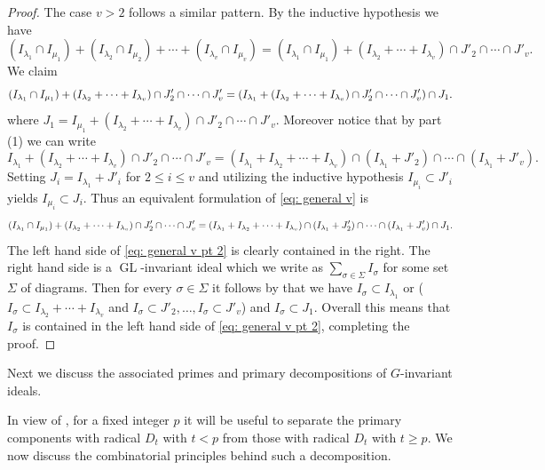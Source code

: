 \documentclass[11pt, reqno]{amsart}
\numberwithin{equation}{section}
\theoremstyle{definition}
\DeclareMathOperator{\GL}{GL}
\renewcommand{\l}{\lambda}
\newcommand{\s}{\sigma}
\begin{document}
\begin{proof}
		The case $v>2$ follows a similar pattern. By the inductive hypothesis we have
		\[
		(I_{\l_1}\cap I_{\mu_1})+ (I_{\l_2}\cap I_{\mu_2})+ \cdots +(I_{\l_v}\cap I_{\mu_v}) =(I_{\l_1}\cap I_{\mu_1})+(I_{\l_2}+\cdots+I_{\l_v})\cap J'_2\cap \cdots \cap J'_{v}.
		\]
		We claim
		\begin{equation}\label{eq: general v}
			(I_{\l_1}\cap I_{\mu_1})+(I_{\l_2}+\cdots+I_{\l_v})\cap J'_2\cap \cdots \cap J'_{v}\\
			=\left( I_{\l_1}+ (I_{\l_2}+\cdots+I_{\l_v})\cap J'_2\cap \cdots \cap J'_{v}\right )\cap J_1.
		\end{equation}
		where $J_1= I_{\mu_1}+ (I_{\l_2}+\cdots+I_{\l_v})\cap J'_2\cap \cdots \cap J'_{v}$.
		Moreover notice that by part (1) we can write
		\[
		I_{\l_1}+ (I_{\l_2}+\cdots+I_{\l_v})\cap J'_2\cap \cdots \cap J'_{v}=(I_{\l_1}+ I_{\l_2}+\cdots+I_{\l_v})\cap (I_{\l_1}+J'_2)\cap \cdots \cap (I_{\l_1}+J'_v).
		\]
		Setting $J_i=I_{\l_1}+J'_i$ for $2\leq i\leq v$ and utilizing the inductive hypothesis $I_{\mu_i}\subset J'_i$ yields $I_{\mu_i}\subset J_i$. Thus an equivalent formulation of  \eqref{eq: general v} is
		\begin{equation}\label{eq: general v pt 2}
			(I_{\l_1}\cap I_{\mu_1})+(I_{\l_2}+\cdots+I_{\l_v})\cap J'_2\cap \cdots \cap J'_{v}\\
			=(I_{\l_1}+ I_{\l_2}+\cdots+I_{\l_v})\cap (I_{\l_1}+J'_2)\cap \cdots \cap (I_{\l_1}+J'_v)\cap J_1.
		\end{equation}
		The left hand side of \eqref{eq: general v pt 2} is clearly contained in the right. The right hand side is a $\GL$-invariant ideal which we write as $\sum_{\sigma\in \Sigma} I_\sigma$ for some set $\Sigma$ of diagrams. Then for every $\s\in \Sigma$ it follows by  \cite[Lemma  7.4]{WhiteheadThesis}  that we have $I_\s\subset I_{\l_1}$ or ($I_\s\subset I_{\l_2}+\cdots +I_{\l_v}$ and $I_\s\subset J'_2, \ldots ,I_\s\subset J'_v$) and $I_\s\subset J_1$. Overall this means that $I_\s$ is contained in the left hand side of \eqref{eq: general v pt 2}, completing the proof.
		\end{proof}

Next we discuss the associated primes and primary decompositions of $G$-invariant ideals.

In view of , for a fixed integer $p$ it will be useful to separate the primary components with radical $D_t$ with  $t< p$ from those with radical  $D_t$ with  $t\geq p$. We now discuss the combinatorial principles behind such a decomposition.
\end{document}
